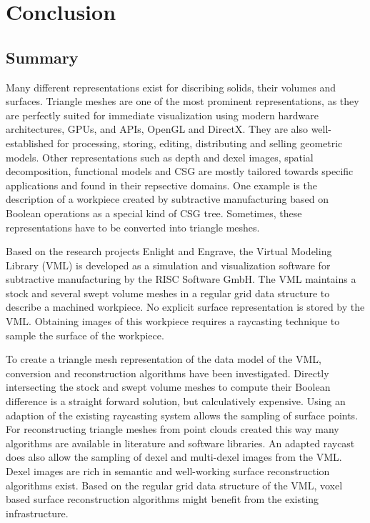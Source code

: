 \chapter{Conclusion}
\label{ch:conclusion}

\section{Summary}
\label{sec:summary}

Many different representations exist for discribing solids, their volumes and surfaces.
Triangle meshes are one of the most prominent representations, as they are perfectly suited for immediate visualization using modern hardware architectures, \ie GPUs, and APIs, \eg OpenGL and DirectX.
They are also well-established for processing, storing, editing, distributing and selling geometric models.
Other representations such as depth and dexel images, spatial decomposition, functional models and CSG are mostly tailored towards specific applications and found in their repsective domains.
One example is the description of a workpiece created by subtractive manufacturing based on Boolean operations as a special kind of CSG tree.
Sometimes, these representations have to be converted into triangle meshes.

Based on the research projects Enlight and Engrave, the Virtual Modeling Library (VML) is developed as a simulation and visualization software for subtractive manufacturing by the RISC Software GmbH.
The VML maintains a stock and several swept volume meshes in a regular grid data structure to describe a machined workpiece.
No explicit surface representation is stored by the VML.
Obtaining images of this workpiece requires a raycasting technique to sample the surface of the workpiece.

To create a triangle mesh representation of the data model of the VML, conversion and reconstruction algorithms have been investigated.
%
Directly intersecting the stock and swept volume meshes to compute their Boolean difference is a straight forward solution, but calculatively expensive.
%
Using an adaption of the existing raycasting system allows the sampling of surface points.
For reconstructing triangle meshes from point clouds created this way many algorithms are available in literature and software libraries.
%
An adapted raycast does also allow the sampling of dexel and multi-dexel images from the VML.
Dexel images are rich in semantic and well-working surface reconstruction algorithms exist.
%
Based on the regular grid data structure of the VML, voxel based surface reconstruction algorithms might benefit from the existing infrastructure.

